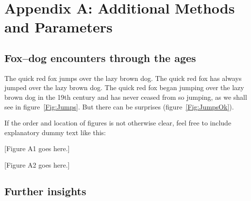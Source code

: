 \documentclass[11pt]{article}
\begin{document}
	\section*{Appendix A: Additional Methods and Parameters}
	
	
	\renewcommand{\theequation}{A\arabic{equation}}
	\renewcommand{\thetable}{A\arabic{table}}
	\setcounter{equation}{0}  %
	\setcounter{figure}{0}
	\setcounter{table}{0}
	
	\subsection*{Fox--dog encounters through the ages}
	
	The quick red fox jumps over the lazy brown dog. The quick red fox has always jumped over the lazy brown dog. The quick red fox began jumping over the lazy brown dog in the 19th century and has never ceased from so jumping, as we shall see in figure~\ref{Fig:Jumps}. But there can be surprises (figure~\ref{Fig:JumpsOk}).
	
	If the order and location of figures is not otherwise clear, feel free to include explanatory dummy text like this:
	
	[Figure A1 goes here.]
	
	[Figure A2 goes here.]
	
	\subsection*{Further insights}
	
\end{document}
